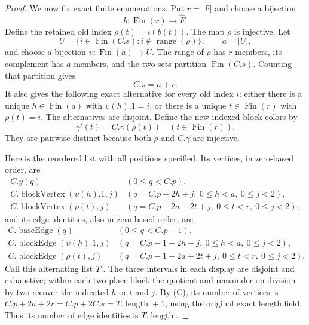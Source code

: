 \begin{proof}
We now fix exact finite enumerations.  Put $r=|F|$ and choose a bijection
\[
 b:\operatorname{Fin}(r)\longrightarrow\widehat F.
\]
Define the retained old index
$\rho(t)=\iota(b(t))$.  The map $\rho$ is injective.  Let
\[
 U=\{i\in\operatorname{Fin}(C.s):
       i\notin\operatorname{range}(\rho)\},\qquad a=|U|,
\]
and choose a bijection $\upsilon:\operatorname{Fin}(a)\to U$.
The range of $\rho$ has $r$ members, its complement has $a$ members, and
the two sets partition $\operatorname{Fin}(C.s)$.  Counting that partition
gives
\[
 \tag{C} C.s=a+r.
\]
It also gives the following exact alternative for every old index $i$:
either there is a unique $h\in\operatorname{Fin}(a)$ with
$\upsilon(h).1=i$, or there is a unique $t\in\operatorname{Fin}(r)$ with
$\rho(t)=i$.  The alternatives are disjoint.  Define the new indexed block
colors by
\[
 \tag{D} \gamma'(t)=C.\gamma(\rho(t))
 \quad(t\in\operatorname{Fin}(r)).
\]
They are pairwise distinct because both $\rho$ and $C.\gamma$ are
injective.

Here is the reordered list with all positions specified.  Its vertices,
in zero-based order, are
\[
\begin{array}{ll}
 C.y(q) & (0\le q<C.p),\\
 C.\operatorname{blockVertex}(\upsilon(h).1,j)
   & (q=C.p+2h+j,\ 0\le h<a,\ 0\le j<2),\\
 C.\operatorname{blockVertex}(\rho(t),j)
   & (q=C.p+2a+2t+j,\ 0\le t<r,\ 0\le j<2),
\end{array}
\]
and its edge identities, also in zero-based order, are
\[
\begin{array}{ll}
 C.\operatorname{baseEdge}(q) & (0\le q<C.p-1),\\
 C.\operatorname{blockEdge}(\upsilon(h).1,j)
   & (q=C.p-1+2h+j,\ 0\le h<a,\ 0\le j<2),\\
 C.\operatorname{blockEdge}(\rho(t),j)
   & (q=C.p-1+2a+2t+j,\ 0\le t<r,\ 0\le j<2).
\end{array}
\]
Call this alternating list $T'$.  The three intervals in each display are
disjoint and exhaustive; within each two-place block the quotient and
remainder on division by two recover the indicated $h$ or $t$ and $j$.
By (C), its number of vertices is
$C.p+2a+2r=C.p+2C.s=T.\operatorname{length}+1$, using the original exact
length field.  Thus its number of edge identities is
$T.\operatorname{length}$.


\end{proof}
